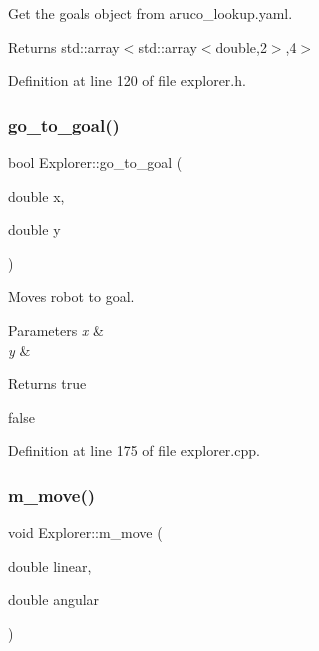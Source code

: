 Get the goals object from aruco\+\_\+lookup.\+yaml. 

\begin{DoxyReturn}{Returns}
std\+::array$<$std\+::array$<$double,2$>$,4$>$ 
\end{DoxyReturn}


Definition at line 120 of file explorer.\+h.

\mbox{\label{class_explorer_aa1e259feaac1114adb0f24588428e8ef}} 
\subsubsection{\texorpdfstring{go\+\_\+to\+\_\+goal()}{go\_to\_goal()}}
{\footnotesize\ttfamily bool Explorer\+::go\+\_\+to\+\_\+goal (\begin{DoxyParamCaption}\item[{double}]{x,  }\item[{double}]{y }\end{DoxyParamCaption})}



Moves robot to goal. 


\begin{DoxyParams}{Parameters}
{\em x} & \\
\hline
{\em y} & \\
\hline
\end{DoxyParams}
\begin{DoxyReturn}{Returns}
true 

false 
\end{DoxyReturn}


Definition at line 175 of file explorer.\+cpp.

\mbox{\label{class_explorer_ace304ef65547f4a3ff6458d934c54e87}} 
\subsubsection{\texorpdfstring{m\+\_\+move()}{m\_move()}}
{\footnotesize\ttfamily void Explorer\+::m\+\_\+move (\begin{DoxyParamCaption}\item[{double}]{linear,  }\item[{double}]{angular }\end{DoxyParamCaption})}



